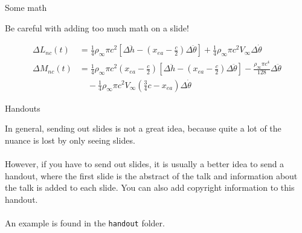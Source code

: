 \documentclass[unknownkeysallowed,aspectratio=43,10pt,onlymath]{beamer}
\begin{document}
\begin{frame}{Some math}

  Be careful with adding too much math on a slide!

  \begin{subequations}
    \begin{align*}
      \Delta L_{nc}(t) &= \frac{1}{4} \rho_{\infty} \pi c^2 \left[ \Delta \ddot{h} - \left(x_{ea} - \frac{c}{2}\right) \Delta \ddot{\theta} \right] + \frac{1}{4}\rho_{\infty} \pi c^2 V_{\!\infty} \Delta\dot{\theta}  \\
      \Delta M_{nc}(t) &= \frac{1}{4} \rho_{\infty} \pi c^2 \left( x_{ea} - \frac{c}{2}\right) \left[\Delta\ddot{h}
      - \left(x_{ea} - \frac{c}{2}\right) \Delta \ddot{\theta}\right] - \frac{\rho_{\infty} \pi c^4}{128} \Delta\ddot{\theta} \\
      & \quad - \frac{1}{4} \rho_{\infty} \pi c^2 V_{\infty} \left(\frac{3}{4} c - x_{ea}\right) \Delta \dot{\theta}
    \end{align*}
  \end{subequations}

\end{frame}

\begin{frame}{Handouts}

  In general, sending out slides is not a great idea, because quite a lot of the nuance is lost by only seeing slides. \\ \ \\

  However, if you have to send out slides, it is usually a better idea to send a handout, where the first slide is the abstract of the talk and information about the talk is added to each slide.
  You can also add copyright information to this handout. \\ \ \\

  An example is found in the \texttt{handout} folder.

\end{frame}

\end{document}
